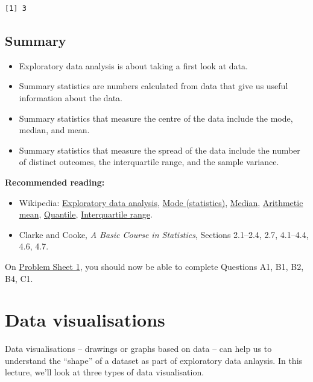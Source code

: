 \documentclass[
  a4paper,
]{book}
\providecommand{\tightlist}{%
  \setlength{\itemsep}{0pt}\setlength{\parskip}{0pt}}
\theoremstyle{definition}
\theoremstyle{definition}
\theoremstyle{definition}
\theoremstyle{definition}
\theoremstyle{remark}
\begin{document}
\begin{verbatim}
[1] 3
\end{verbatim}

\hypertarget{summary-01}{%
\section*{Summary}\label{summary-01}}

\begin{itemize}
\tightlist
\item
  Exploratory data analysis is about taking a first look at data.
\item
  Summary statistics are numbers calculated from data that give us useful information about the data.
\item
  Summary statistics that measure the centre of the data include the mode, median, and mean.
\item
  Summary statistics that measure the spread of the data include the number of distinct outcomes, the interquartile range, and the sample variance.
\end{itemize}

\textbf{Recommended reading:}

\begin{itemize}
\tightlist
\item
  Wikipedia: \href{https://en.wikipedia.org/wiki/Exploratory_data_analysis}{Exploratory data analysis}, \href{https://en.wikipedia.org/wiki/Mode_(statistics)}{Mode (statistics)}, \href{https://en.wikipedia.org/wiki/Median}{Median}, \href{https://en.wikipedia.org/wiki/Arithmetic_mean}{Arithmetic mean}, \href{https://en.wikipedia.org/wiki/Quantile}{Quantile}, \href{https://en.wikipedia.org/wiki/Interquartile_range}{Interquartile range}.
\item
  Clarke and Cooke, \emph{A Basic Course in Statistics}, Sections 2.1--2.4, 2.7, 4.1--4.4, 4.6, 4.7.
\end{itemize}

On \protect\hyperlink{P1}{Problem Sheet 1}, you should now be able to complete Questions A1, B1, B2, B4, C1.

\hypertarget{L02-dataviz}{%
\chapter{Data visualisations}\label{L02-dataviz}}

Data visualisations -- drawings or graphs based on data -- can help us to understand the ``shape'' of a dataset as part of exploratory data anlaysis. In this lecture, we'll look at three types of data visualisation.
\end{document}
